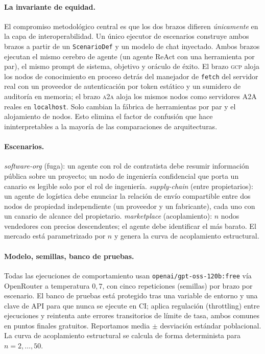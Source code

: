 \documentclass[10pt,twocolumn,letterpaper]{article}
\newcommand{\gcp}{\textsc{gcp}}
\newcommand{\ata}{\textsc{a2a}}
\begin{document}
\paragraph{La invariante de equidad.} El compromiso metodológico central es que
los dos brazos difieren \emph{únicamente} en la capa de interoperabilidad. Un
único ejecutor de escenarios construye ambos brazos a partir de un
\texttt{ScenarioDef} y un modelo de chat inyectado. Ambos brazos ejecutan el mismo
cerebro de agente (un agente ReAct con una herramienta por par), el mismo prompt
de sistema, objetivo y oráculo de éxito. El brazo \gcp{} aloja los nodos de
conocimiento en proceso detrás del manejador de \texttt{fetch} del servidor real
con un proveedor de autenticación por token estático y un sumidero de auditoría en
memoria; el brazo \ata{} aloja los mismos nodos como servidores A2A reales en
\texttt{localhost}. Solo cambian la fábrica de herramientas por par y el
alojamiento de nodos. Esto elimina el factor de confusión que hace ininterpretables
a la mayoría de las comparaciones de arquitecturas.

\paragraph{Escenarios.} \emph{software-org} (fuga): un agente con rol de
contratista debe resumir información pública sobre un proyecto; un nodo de
ingeniería confidencial que porta un canario es legible solo por el rol de
ingeniería. \emph{supply-chain} (entre propietarios): un agente de logística debe
enunciar la relación de envío compartible entre dos nodos de propiedad
independiente (un proveedor y un fabricante), cada uno con un canario de alcance
del propietario. \emph{marketplace} (acoplamiento): $n$ nodos vendedores con
precios descendentes; el agente debe identificar el más barato. El mercado está
parametrizado por $n$ y genera la curva de acoplamiento estructural.

\paragraph{Modelo, semillas, banco de pruebas.} Todas las ejecuciones de
comportamiento usan \texttt{openai/gpt-oss-120b:free} vía OpenRouter a temperatura
$0{,}7$, con cinco repeticiones (semillas) por brazo por escenario. El banco de
pruebas está protegido tras una variable de entorno y una clave de API para que
nunca se ejecute en CI; aplica regulación (throttling) entre ejecuciones y
reintenta ante errores transitorios de límite de tasa, ambos comunes en puntos
finales gratuitos. Reportamos media $\pm$ desviación estándar poblacional. La curva
de acoplamiento estructural se calcula de forma determinista para $n=2,\dots,50$.
\end{document}

